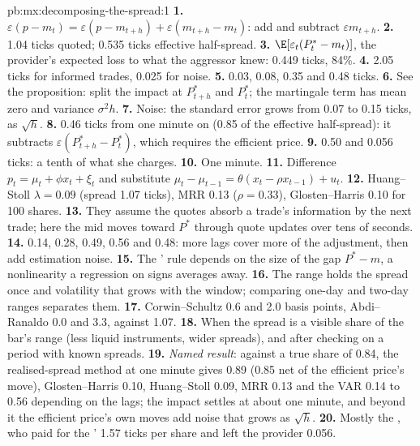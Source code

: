 \begin{solution}{pb:mx:decomposing-the-spread:1}
\textbf{1.} $\varepsilon(p-m_t)=\varepsilon(p-m_{t+h})+\varepsilon(m_{t+h}-m_t)$: add and subtract $\varepsilon m_{t+h}$.
\textbf{2.} 1.04 ticks quoted; 0.535 ticks effective half-spread.
\textbf{3.} $\E[\varepsilon_t(P^\ast_t-m_t)]$, the provider's expected loss to what the aggressor knew: 0.449 ticks, 84\%.
\textbf{4.} 2.05 ticks for informed trades, 0.025 for noise.
\textbf{5.} 0.03, 0.08, 0.35 and 0.48 ticks.
\textbf{6.} See the proposition: split the impact at $P^\ast_{t+h}$ and $P^\ast_t$; the martingale term has mean zero and variance $\sigma^2h$.
\textbf{7.} Noise: the standard error grows from 0.07 to 0.15 ticks, as $\sqrt h$.
\textbf{8.} 0.46 ticks from one minute on (0.85 of the effective half-spread): it subtracts $\varepsilon(P^\ast_{t+h}-P^\ast_t)$, which requires the efficient
price.
\textbf{9.} 0.50 and 0.056 ticks: a tenth of what she charges.
\textbf{10.} One minute.
\textbf{11.} Difference $p_t=\mu_t+\phi x_t+\xi_t$ and substitute $\mu_t-\mu_{t-1}=\theta(x_t-\rho x_{t-1})+u_t$.
\textbf{12.} Huang--Stoll $\lambda=0.09$ (spread 1.07 ticks), MRR 0.13 ($\rho=0.33$), Glosten--Harris 0.10 for 100 shares.
\textbf{13.} They assume the quotes absorb a trade's information by the next trade; here the mid moves toward $P^\ast$ through quote updates over tens of
seconds.
\textbf{14.} 0.14, 0.28, 0.49, 0.56 and 0.48: more lags cover more of the adjustment, then add estimation noise.
\textbf{15.} The ' rule depends on the size of the gap $P^\ast-m$, a nonlinearity a regression on signs averages away.
\textbf{16.} The range holds the spread once and volatility that grows with the window; comparing one-day and two-day ranges separates them.
\textbf{17.} Corwin--Schultz 0.6 and 2.0 basis points, Abdi--Ranaldo 0.0 and 3.3, against 1.07.
\textbf{18.} When the spread is a visible share of the bar's range (less liquid instruments, wider spreads), and after checking on a period with known spreads.
\textbf{19.} \emph{Named result}: against a true share of 0.84, the realised-spread method at one minute gives 0.89 (0.85 net of the efficient price's move),
Glosten--Harris 0.10, Huang--Stoll 0.09, MRR 0.13 and the VAR 0.14 to 0.56 depending on the lags; the impact settles at about one minute, and beyond it
the efficient price's own moves add noise that grows as $\sqrt h$.
\textbf{20.} Mostly the , who paid for the ' 1.57 ticks per share and left the provider 0.056.
\end{solution}

